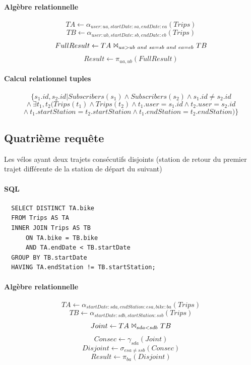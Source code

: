 \documentclass[a4paper]{article}
\begin{document}
    \paragraph{Algèbre relationnelle}
    $$ TA \leftarrow \alpha_{user:ua, startDate:sa, endDate:ea}(Trips) $$
    $$ TB \leftarrow \alpha_{user:ub, startDate:sb, endDate:eb}(Trips) $$
    $$ FullResult \leftarrow TA\ \Bowtie_{ua>ub\ and\ sa=sb\ and\ ea=eb}\ TB$$
    $$ Result \leftarrow \pi_{ua, ub} (FullResult) $$

    \paragraph{Calcul relationnel tuples}
    $$ \{ s_1.id, s_2.id | Subscribers(s_1) \land Subscribers(s_2) \land s_1.id \neq s_2.id $$
    $$ \land\ \exists t_1, t_2 (Trips(t_1) \land Trips(t_2) \land t_1.user = s_1.id \land t_2.user = s_2.id $$
    $$ \land\ t_1.startStation = t_2.startStation \land t_1.endStation = t_2.endStation) \} $$



\subsection{Quatrième requête}
    Les vélos ayant deux trajets consécutifs disjoints (station de retour du premier trajet différente de la station de départ du suivant)

    \paragraph{SQL}
  \begin{verbatim}
  SELECT DISTINCT TA.bike
  FROM Trips AS TA
  INNER JOIN Trips AS TB
      ON TA.bike = TB.bike
      AND TA.endDate < TB.startDate
  GROUP BY TB.startDate
  HAVING TA.endStation != TB.startStation;
  \end{verbatim}
  
    \paragraph{Algèbre relationnelle}
    $$ TA \leftarrow \alpha_{startDate:sda, endStation:esa, bike:ba}(Trips) $$
    $$ TB \leftarrow \alpha_{startDate:sdb, startStation:ssb}(Trips) $$
    $$ Joint \leftarrow TA\ \Bowtie_{sda < sdb}\ TB $$
    $$ Consec \leftarrow \gamma_{sda}(Joint) $$
    $$ Disjoint \leftarrow \sigma_{esa \neq ssb}(Consec)$$
    $$ Result \leftarrow \pi_{ba}(Disjoint)$$
    
\end{document}
